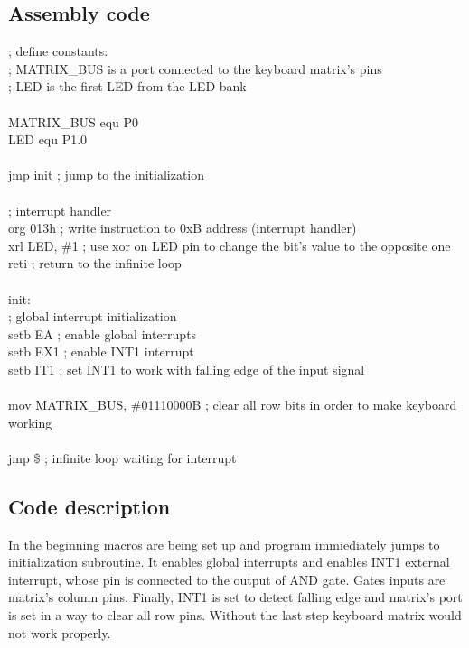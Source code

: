 \documentclass{article}
\begin{document}
\subsection{Assembly code}
\ttfamily
; define constants: \\
; MATRIX\_BUS is a port connected to the keyboard matrix's pins\\
; LED is the first LED from the LED bank\\
\\
MATRIX\_BUS  equ     P0\\
LED         equ     P1.0\\
\\
    jmp     init    ; jump to the initialization\\
\\
    ; interrupt handler\\
    org     013h         ; write instruction to 0xB address (interrupt handler)\\
    xrl     LED, \#1     ; use xor on LED pin to change the bit's value to the opposite one\\
    reti                ; return to the infinite loop\\
\\
init:\\
; global interrupt initialization\\
    setb    EA                      ; enable global interrupts\\
    setb    EX1                     ; enable INT1 interrupt\\
    setb    IT1                     ; set INT1 to work with falling edge of the input signal\\
\\
    mov     MATRIX\_BUS, \#01110000B  ; clear all row bits in order to make keyboard working\\
\\
    jmp     \$                       ; infinite loop waiting for interrupt

\rmfamily

\subsection{Code description}
In the beginning macros are being set up and program immiediately jumps to initialization subroutine.
It enables global interrupts and enables INT1 external interrupt, whose pin is connected to the
output of AND gate. Gates inputs are matrix's column pins. Finally, INT1 is set to detect falling edge
and matrix's port is set in a way to clear all row pins. Without the last step keyboard matrix
would not work properly.
\end{document}
